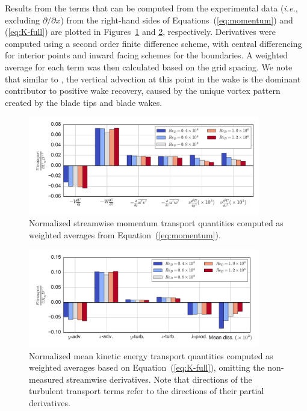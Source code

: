 \documentclass[energies,article,accept,moreauthors,pdftex,10pt,a4paper]{mdpi}
\theoremstyle{mdpi}
\newcounter{ex}
\newcounter{re}
\begin{document}
Results from the terms that can be computed from the experimental data
(\emph{i.e.}, excluding $\partial / \partial x$) from the right-hand sides of
Equations~(\ref{eq:momentum}) and (\ref{eq:K-full}) are plotted in
Figures~\ref{fig:mom-bar-graph} and \ref{fig:K-bar-graph}, respectively.
Derivatives were computed using a second order finite difference scheme, with
central differencing for interior points and inward facing schemes for the
boundaries. A weighted average for each term was then calculated based on the
grid spacing. We note that similar to \cite{Bachant2015-JoT}, the vertical
advection at this point in the wake is the dominant contributor to positive wake
recovery, caused by the unique vortex pattern created by the blade tips and
blade wakes.

\begin{figure}[H]
 \centering
 
 \includegraphics[width=0.9\textwidth]{figures/mom_bar_graph}
 
 \caption{Normalized streamwise momentum transport quantities computed as
     weighted averages from Equation~(\ref{eq:momentum}).}
 
 \label{fig:mom-bar-graph}
\end{figure}

\begin{figure}[H]
 \centering
 
 \includegraphics[width=0.9\textwidth]{figures/K_trans_bar_graph}
 
 \caption{Normalized mean kinetic energy transport quantities computed as
 weighted averages based on Equation~(\ref{eq:K-full}), omitting the
 non-measured streamwise derivatives. Note that directions of the turbulent
 transport terms refer to the directions of their partial derivatives.}
 
 \label{fig:K-bar-graph}
\end{figure}
\end{document}
